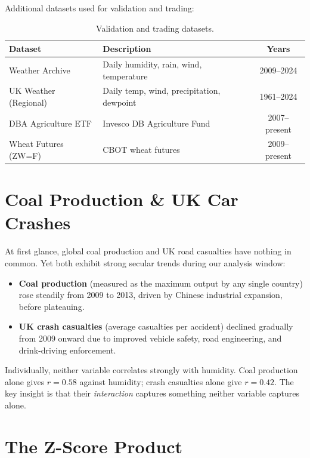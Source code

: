 \documentclass[12pt,a4paper]{article}
\begin{document}
Additional datasets used for validation and trading:

\begin{table}[H]
\centering
\begin{tabular}{@{}llc@{}}
\toprule
\textbf{Dataset} & \textbf{Description} & \textbf{Years} \\
\midrule
Weather Archive & Daily humidity, rain, wind, temperature & 2009--2024 \\
UK Weather (Regional) & Daily temp, wind, precipitation, dewpoint & 1961--2024 \\
DBA Agriculture ETF & Invesco DB Agriculture Fund & 2007--present \\
Wheat Futures (ZW=F) & CBOT wheat futures & 2009--present \\
\bottomrule
\end{tabular}
\caption{Validation and trading datasets.}
\end{table}

\section{Coal Production \& UK Car Crashes}

At first glance, global coal production and UK road casualties have nothing in common. Yet both exhibit strong secular trends during our analysis window:

\begin{itemize}[nosep]
    \item \textbf{Coal production} (measured as the maximum output by any single country) rose steadily from 2009 to 2013, driven by Chinese industrial expansion, before plateauing.
    \item \textbf{UK crash casualties} (average casualties per accident) declined gradually from 2009 onward due to improved vehicle safety, road engineering, and drink-driving enforcement.
\end{itemize}

Individually, neither variable correlates strongly with humidity. Coal production alone gives $r = 0.58$ against humidity; crash casualties alone give $r = 0.42$. The key insight is that their \textit{interaction} captures something neither variable captures alone.

\section{The Z-Score Product}
\end{document}
